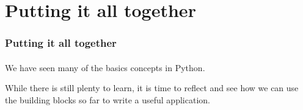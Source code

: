 \section{Putting it all together} %
\label{sec:putting_it_all_together}

\begin{frame}\frametitle{Putting it all together}
    \framesubtitle{}

    We have seen many of the basics concepts in Python.

    \vfill

    While there is still plenty to learn, it is time to reflect and see
    how we can use the building blocks so far to write a useful application.

\end{frame}

